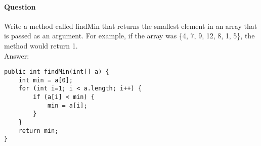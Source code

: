 \documentclass{article}
\begin{document}
\addtocounter{question_num}{1}
\paragraph{Question }
Write a method called findMin that returns the smallest element in an array that is passed as an argument. For example, if the array was \{4, 7, 9, 12, 8, 1, 5\}, the method would return 1.
\\
{\color{red}Answer:}
\begin{lstlisting}
public int findMin(int[] a) {
	int min = a[0];
	for (int i=1; i < a.length; i++) {
		if (a[i] < min) {
			min = a[i];
		}
	}
	return min;
}
\end{lstlisting}
\end{document}
